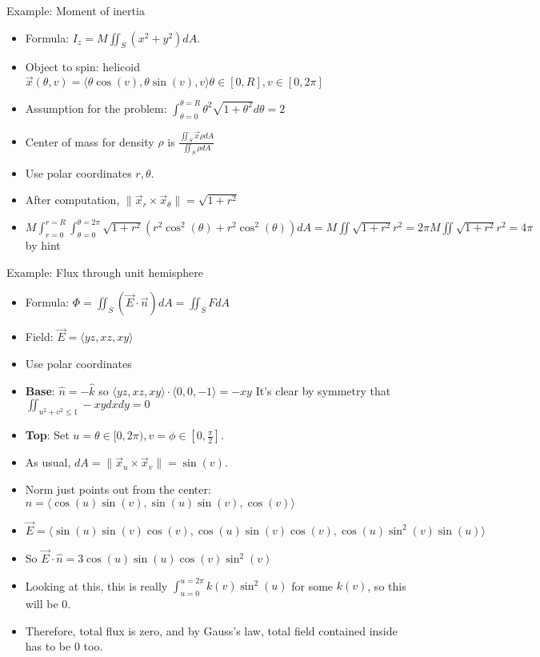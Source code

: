 \documentclass[11pt, oneside]{article}   	%
\begin{document}
Example: Moment of inertia
\begin{itemize}
\item Formula: $I_z = M \iint_S(x^2 + y^2)dA$.
\item Object to spin: helicoid $\vec{x}(\theta,v) = \langle \theta \cos (v), \theta \sin (v), v\rangle \theta \in [0,R], v \in [0, 2\pi]$
\item Assumption for the problem: $\int_{\theta=0}^{\theta=R} \theta^2 \sqrt{1 +\theta^2}d\theta = 2$
\item Center of mass for density $\rho$ is $\frac{\iint_S \vec{x} \rho dA}{\iint_S \rho dA}$
\item Use polar coordinates $r, \theta$.
\item After computation, $\| \vec{x}_r  \times \vec{x}_{\theta} \| = \sqrt{1+r^2}$
\item $M \int_{r=0}^{r=R} \int_{\theta = 0}^{\theta=2\pi}  \sqrt{1+r^2} (r^2 \cos^2(\theta) + r^2 \cos^2(\theta)) dA = M \iint  \sqrt{1+r^2} r^2 = 2\pi M \iint  \sqrt{1+r^2} r^2  = 4 \pi$ by hint
\end{itemize}


Example: Flux through unit hemisphere
\begin{itemize}
\item Formula: $\Phi = \iint_S (\vec{E} \cdot \vec{n}) dA = \iint_S FdA$
\item Field: $\vec{E} = \langle yz, xz, xy \rangle$
\item Use polar coordinates
\item \textbf{Base}: $\hat{n} = -\hat{k}$ so $\langle yz, xz, xy \rangle \cdot \langle 0, 0, -1 \rangle = -xy$ It's clear by symmetry that $\iint_{u^2 + v^2 \leq 1} - xy dx dy = 0$
\item \textbf{Top}: Set $u = \theta \in [0, 2 \pi), v = \phi \in [0, \frac{\pi}{2}]$.  
\item As usual, $dA = \| \vec{x}_u \times \vec{x}_v \| = \sin(v)$.
\item Norm just points out from the center: $\hat{n} = \langle  \cos(u)\sin(v), \sin(u)\sin(v), \cos(v) \rangle $ 
\item $\vec{E} = \langle \sin(u)\sin(v)\cos(v), \cos(u)\sin(v)\cos(v), \cos(u)\sin^2(v)\sin(u)\rangle$ 
\item So $\vec{E} \cdot \hat{n} = 3\cos(u)\sin(u)\cos(v)\sin^2(v)$
\item Looking at this, this is really $\int_{u = 0}^{u = 2\pi} k(v) \sin^2(u)$  for some $k(v)$, so this will be 0.
\item Therefore, total flux is zero, and by Gauss's law, total field contained inside has to be 0 too.
\end{itemize}
\end{document}
